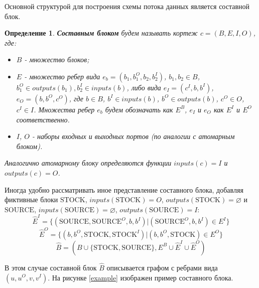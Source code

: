 \documentclass[10pt,a4paper]{article}
\newtheorem{defen}{Определение}
\newcommand{\stock}{\text{STOCK}}
\newcommand{\source}{\text{SOURCE}}
\begin{document}
Основной структурой для построения схемы потока данных является составной блок.

\begin{defen}
 \textbf{Составным блоком} будем называть кортеж $c = (B, E, I, O)$, где:
 \begin{itemize}
    \item $B$ - множество блоков;
    \item $E$ - множество ребер вида $e_b = (b_1, b^O_{1}, b_2, b^I_{2})$, $b_1, b_2 \in B$, $b^O_{1} \in outputs(b_1), b^I_{2} \in inputs(b)$,
                либо вида $e_I = (c^I, b, b^I)$, $e_O = (b, b^O, c^O)$, где $b \in B$, $b^I \in inputs(b)$, $b^O \in outputs(b)$, $c^O \in O$, $c^I \in I$.
                Множества ребер $e_b$ будем обозначать как $E^B$, $e_I$ и $e_O$ как $E^I$ и $E^O$ соответственно.
    \item $I$, $O$ - наборы входных и выходных портов (по аналогии с атомарным блоком).
  \end{itemize}
  Аналогично атомарному блоку определяются функции $inputs(c) = I$ и $outputs(c) = O$.
\end{defen}

Иногда удобно рассматривать иное представление составного блока, добавляя фиктивные блоки $\stock$, $inputs(\stock) = O$, $outputs(\stock) = \varnothing$
  и $\source$, $inputs(\source) = \varnothing$, $outputs(\source) = I$:
$$\hat{E}^I = \{(\source, \source^O, b, b^I) \vert (\source^O, b, b^I) \in E^I\}$$
$$\hat{E}^O = \{ (b, b^O, \stock, \stock^I) \vert (b, b^O, \stock) \in E^O \}$$
$$\hat{B} = (B \cup \{\stock, \source\}, E^B \cup \hat{E}^I \cup \hat{E}^O)$$

В этом случае составной блок $\hat{B}$ описывается графом с ребрами вида $(u, u^O, v, v^I)$. На рисунке \ref{example} изображен пример составного блока.
\end{document}

